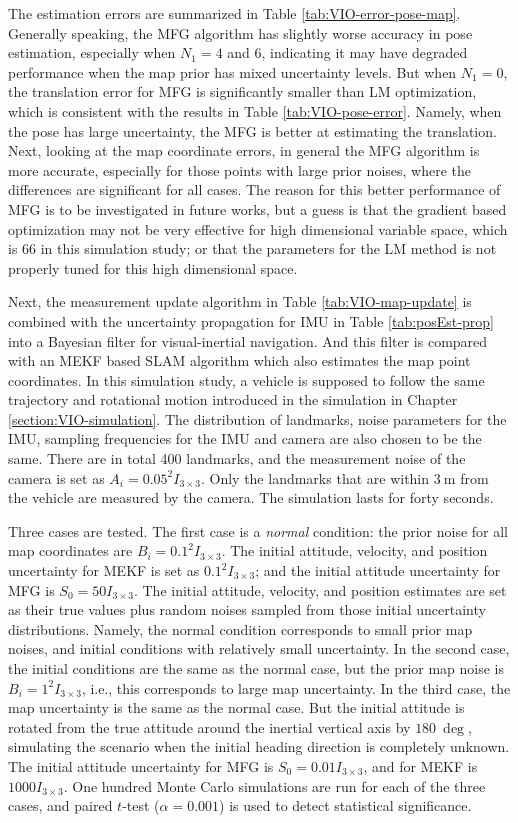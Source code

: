 The estimation errors are summarized in Table \ref{tab:VIO-error-pose-map}.
Generally speaking, the MFG algorithm has slightly worse accuracy in pose estimation, especially when $N_1 = 4$ and 6, indicating it may have degraded performance when the map prior has mixed uncertainty levels.
But when $N_1 = 0$, the translation error for MFG is significantly smaller than LM optimization, which is consistent with the results in Table \ref{tab:VIO-pose-error}.
Namely, when the pose has large uncertainty, the MFG is better at estimating the translation.
Next, looking at the map coordinate errors, in general the MFG algorithm is more accurate, especially for those points with large prior noises, where the differences are significant for all cases.
The reason for this better performance of MFG is to be investigated in future works, but a guess is that the gradient based optimization may not be very effective for high dimensional variable space, which is 66 in this simulation study; or that the parameters for the LM method is not properly tuned for this high dimensional space.

Next, the measurement update algorithm in Table \ref{tab:VIO-map-update} is combined with the uncertainty propagation for IMU in Table \ref{tab:posEst-prop} into a Bayesian filter for visual-inertial navigation.
And this filter is compared with an MEKF based SLAM algorithm which also estimates the map point coordinates.
In this simulation study, a vehicle is supposed to follow the same trajectory and rotational motion introduced in the simulation in Chapter \ref{section:VIO-simulation}.
The distribution of landmarks, noise parameters for the IMU, sampling frequencies for the IMU and camera are also chosen to be the same.
There are in total 400 landmarks, and the measurement noise of the camera is set as $A_i = 0.05^2I_{3\times 3}$.
Only the landmarks that are within $\SI{3}{\meter}$ from the vehicle are measured by the camera.
The simulation lasts for forty seconds.

Three cases are tested.
The first case is a \textit{normal} condition: the prior noise for all map coordinates are $B_i = 0.1^2I_{3\times 3}$.
The initial attitude, velocity, and position uncertainty for MEKF is set as $0.1^2I_{3\times 3}$; and the initial attitude uncertainty for MFG is $S_0 = 50I_{3\times 3}$.
The initial attitude, velocity, and position estimates are set as their true values plus random noises sampled from those initial uncertainty distributions.
Namely, the normal condition corresponds to small prior map noises, and initial conditions with relatively small uncertainty.
In the second case, the initial conditions are the same as the normal case, but the prior map noise is $B_i = 1^2I_{3\times 3}$, i.e., this corresponds to large map uncertainty.
In the third case, the map uncertainty is the same as the normal case.
But the initial attitude is rotated from the true attitude around the inertial vertical axis by $\SI{180}{\deg}$, simulating the scenario when the initial heading direction is completely unknown.
The initial attitude uncertainty for MFG is $S_0 = 0.01I_{3\times 3}$, and for MEKF is $1000I_{3\times 3}$.
One hundred Monte Carlo simulations are run for each of the three cases, and paired $t$-test ($\alpha=0.001$) is used to detect statistical significance.

